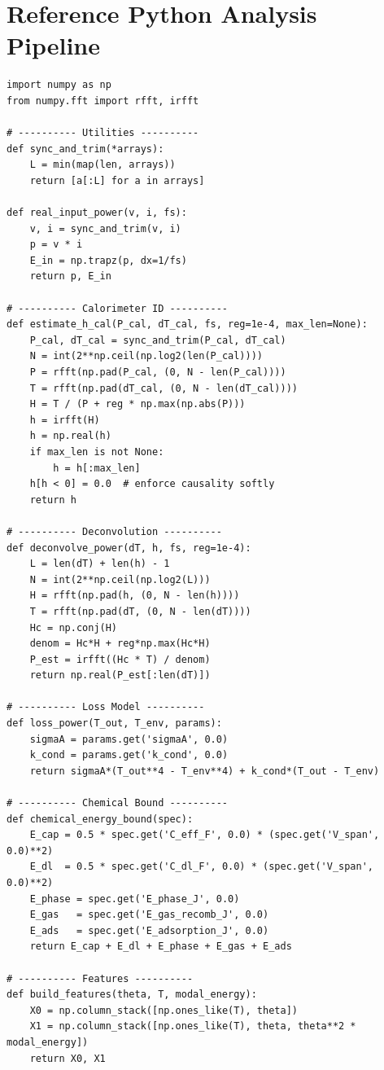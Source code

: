 \documentclass[11pt]{article}
\theoremstyle{remark}
\begin{document}
\section{Reference Python Analysis Pipeline}
\label{app:pipeline}
\lstset{style=code,language=Python}
\begin{lstlisting}
import numpy as np
from numpy.fft import rfft, irfft

# ---------- Utilities ----------
def sync_and_trim(*arrays):
    L = min(map(len, arrays))
    return [a[:L] for a in arrays]

def real_input_power(v, i, fs):
    v, i = sync_and_trim(v, i)
    p = v * i
    E_in = np.trapz(p, dx=1/fs)
    return p, E_in

# ---------- Calorimeter ID ----------
def estimate_h_cal(P_cal, dT_cal, fs, reg=1e-4, max_len=None):
    P_cal, dT_cal = sync_and_trim(P_cal, dT_cal)
    N = int(2**np.ceil(np.log2(len(P_cal))))
    P = rfft(np.pad(P_cal, (0, N - len(P_cal))))
    T = rfft(np.pad(dT_cal, (0, N - len(dT_cal))))
    H = T / (P + reg * np.max(np.abs(P)))
    h = irfft(H)
    h = np.real(h)
    if max_len is not None:
        h = h[:max_len]
    h[h < 0] = 0.0  # enforce causality softly
    return h

# ---------- Deconvolution ----------
def deconvolve_power(dT, h, fs, reg=1e-4):
    L = len(dT) + len(h) - 1
    N = int(2**np.ceil(np.log2(L)))
    H = rfft(np.pad(h, (0, N - len(h))))
    T = rfft(np.pad(dT, (0, N - len(dT))))
    Hc = np.conj(H)
    denom = Hc*H + reg*np.max(Hc*H)
    P_est = irfft((Hc * T) / denom)
    return np.real(P_est[:len(dT)])

# ---------- Loss Model ----------
def loss_power(T_out, T_env, params):
    sigmaA = params.get('sigmaA', 0.0)
    k_cond = params.get('k_cond', 0.0)
    return sigmaA*(T_out**4 - T_env**4) + k_cond*(T_out - T_env)

# ---------- Chemical Bound ----------
def chemical_energy_bound(spec):
    E_cap = 0.5 * spec.get('C_eff_F', 0.0) * (spec.get('V_span', 0.0)**2)
    E_dl  = 0.5 * spec.get('C_dl_F', 0.0) * (spec.get('V_span', 0.0)**2)
    E_phase = spec.get('E_phase_J', 0.0)
    E_gas   = spec.get('E_gas_recomb_J', 0.0)
    E_ads   = spec.get('E_adsorption_J', 0.0)
    return E_cap + E_dl + E_phase + E_gas + E_ads

# ---------- Features ----------
def build_features(theta, T, modal_energy):
    X0 = np.column_stack([np.ones_like(T), theta])
    X1 = np.column_stack([np.ones_like(T), theta, theta**2 * modal_energy])
    return X0, X1


\end{lstlisting}
\end{document}
